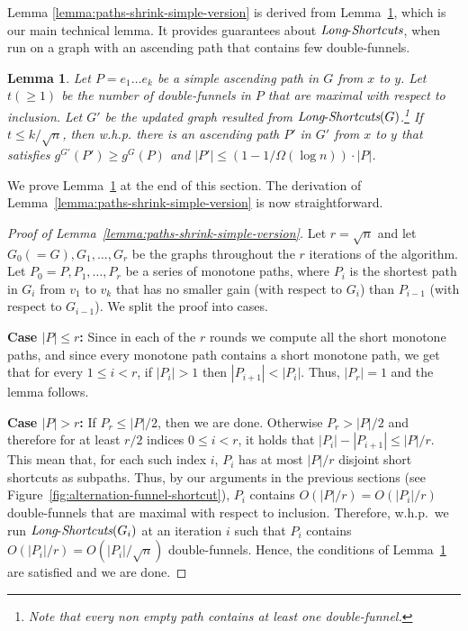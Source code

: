 \documentclass[11pt]{article}
\newtheorem{lemma}[theorem]{Lemma}
\newcommand{\LS}{\mbox{{\it Long}-{\it Shortcuts}}}
\begin{document}
 Lemma \ref{lemma:paths-shrink-simple-version} is  derived from Lemma~\ref{lemma:long-shortcuts-shrinks-simple-version}, which is our main technical lemma. It provides guarantees about $\LS$, when run on a graph with an ascending path that contains few double-funnels. 


\begin{lemma}\label{lemma:long-shortcuts-shrinks-simple-version}
    Let $P = e_1 \ldots e_k$ be a simple ascending path in $G$ from $x$ to $y$. 
    Let $t(\ge 1)$ be the number of double-funnels in $P$ that are maximal with respect to inclusion. Let $G'$ be the updated graph resulted from $\LS(G)$.\footnote{Note that every non empty path contains at least one double-funnel.} If $t \le k / \sqrt{n} $, then w.h.p. there is an ascending path $P'$ in $G'$ from $x$ to $y$ that satisfies $g^{G'}(P')\ge g^{G}(P)$ and $|P'| \le (1-1/\Omega(\log n))\cdot |P|$. 
\end{lemma}


We prove Lemma~\ref{lemma:long-shortcuts-shrinks-simple-version} at the end of this section. The derivation of Lemma~\ref{lemma:paths-shrink-simple-version} is now straightforward.

\begin{proof}[Proof of Lemma~\ref{lemma:paths-shrink-simple-version}]
    Let $r= \sqrt{n}$ and let $G_0(=G),G_1,\ldots, G_r$ be the graphs throughout the $r$ iterations of the algorithm. Let $P_0=P,P_1,\ldots, P_r$ be a series of monotone paths, where $P_i$ is the shortest path in $G_i$ from $v_1$ to $v_k$ that has no smaller
    gain (with respect to $G_i$) than $P_{i-1}$ (with respect to $G_{i-1}$). We split the proof into cases.
    
     \textbf{Case $|P|\le r$:} Since in each of the $r$ rounds we compute all the short monotone paths, 
     and since every monotone path contains a short monotone path, we get that for every $1\le i < r$, if $|P_i|>1$ then $|P_{i+1}| < |P_i|$. Thus, $|P_r|=1$ and the lemma follows.

    \textbf{Case $|P| > r$:} 
    If $P_r \le |P|/2$, then we are done. Otherwise $P_r > |P|/2$ and therefore for at least $r/2$ indices $0\le i< r$, it holds that $|P_i|-|P_{i+1}| \le |P|/r$. This mean that, for each such index $i$, $P_i$ has at most $|P|/r$ disjoint short shortcuts as subpaths. 
    Thus,
    by our arguments in the previous sections (see Figure~\ref{fig:alternation-funnel-shortcut}),
    $P_i$ contains $O(|P|/r) = O(|P_i|/r)$  double-funnels that are maximal with respect to inclusion. 
    Therefore,
    w.h.p.\ we run $\LS(G_i)$ at an iteration $i$ such that $P_i$ contains $O(|P_i|/r) = O(|P_i|/\sqrt{n})$ double-funnels. Hence, the conditions of Lemma~\ref{lemma:long-shortcuts-shrinks-simple-version} are satisfied and we are done. 
\end{proof}
\end{document}
